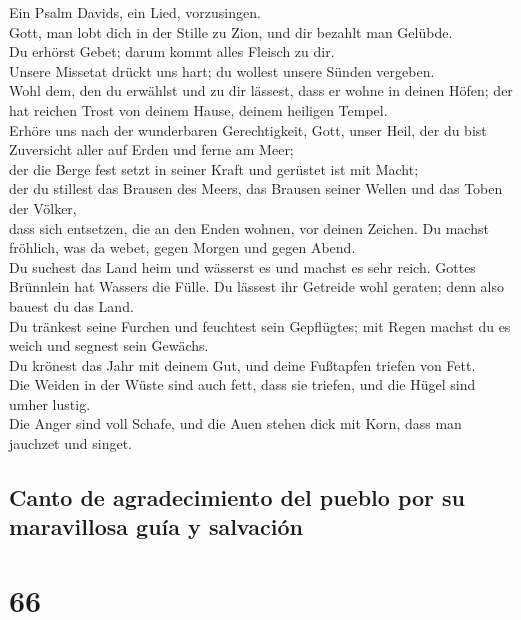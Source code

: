  Ein Psalm Davids, ein Lied, vorzusingen.\\
 Gott, man lobt dich in der Stille zu Zion, und dir
bezahlt man Gelübde.\\
 Du erhörst Gebet; darum kommt alles Fleisch zu dir.\\
 Unsere Missetat drückt uns hart; du wollest unsere Sünden
vergeben.\\
 Wohl dem, den du erwählst und zu dir lässest, dass er
wohne in deinen Höfen; der hat reichen Trost von deinem Hause, deinem
heiligen Tempel.\\
 Erhöre uns nach der wunderbaren Gerechtigkeit, Gott,
unser Heil, der du bist Zuversicht aller auf Erden und ferne am Meer;\\
 der die Berge fest setzt in seiner Kraft und gerüstet ist
mit Macht;\\
 der du stillest das Brausen des Meers, das Brausen seiner
Wellen und das Toben der Völker,\\
 dass sich entsetzen, die an den Enden wohnen, vor deinen
Zeichen. Du machst fröhlich, was da webet, gegen Morgen und gegen
Abend.\\
 Du suchest das Land heim und wässerst es und machst es
sehr reich. Gottes Brünnlein hat Wassers die Fülle. Du lässest ihr
Getreide wohl geraten; denn also bauest du das Land.\\
 Du tränkest seine Furchen und feuchtest sein Gepflügtes;
mit Regen machst du es weich und segnest sein Gewächs.\\
 Du krönest das Jahr mit deinem Gut, und deine Fußtapfen
triefen von Fett.\\
 Die Weiden in der Wüste sind auch fett, dass sie
triefen, und die Hügel sind umher lustig.\\
 Die Anger sind voll Schafe, und die Auen stehen dick mit
Korn, dass man jauchzet und singet.

\hypertarget{canto-de-agradecimiento-del-pueblo-por-su-maravillosa-guuxeda-y-salvaciuxf3n}{%
\subsection{Canto de agradecimiento del pueblo por su maravillosa guía y
salvación}\label{canto-de-agradecimiento-del-pueblo-por-su-maravillosa-guuxeda-y-salvaciuxf3n}}

\hypertarget{section-65}{%
\section{66}\label{section-65}}

